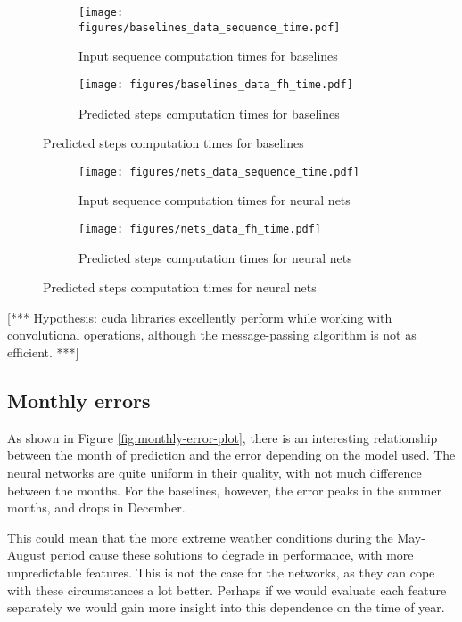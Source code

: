 \begin{figure}
\centering
  \begin{subfigure}[b]{0.49\textwidth}
    \texttt{[image: figures/baselines\_data\_sequence\_time.pdf]}
    \caption{Input sequence computation times for baselines}
    \label{fig:1}
  \end{subfigure}
 \hfill
  \begin{subfigure}[b]{0.49\textwidth}
    \texttt{[image: figures/baselines\_data\_fh\_time.pdf]}
    \caption{Predicted steps computation times for baselines}
    \label{fig:baselines-computation-times}
  \end{subfigure}
\end{figure}

\begin{figure}
\centering
  \begin{subfigure}[b]{0.49\textwidth}
    \texttt{[image: figures/nets\_data\_sequence\_time.pdf]}
    \caption{Input sequence computation times for neural nets}
    \label{fig:1}
  \end{subfigure}
 \hfill
  \begin{subfigure}[b]{0.49\textwidth}
    \texttt{[image: figures/nets\_data\_fh\_time.pdf]}
    \caption{Predicted steps computation times for neural nets}
    \label{fig:nets-computation-times}
  \end{subfigure}
\end{figure}
[*** Hypothesis: cuda libraries excellently perform while working with convolutional operations, although the message-passing algorithm is not as efficient. ***]

\FloatBarrier

\subsection{Monthly errors}
As shown in Figure \ref{fig:monthly-error-plot}, there is an interesting relationship between the month of prediction and the error depending on the model used. The neural networks are quite uniform in their quality, with not much difference between the months. For the baselines, however, the error peaks in the summer months, and drops in December.

This could mean that the more extreme weather conditions during the May-August period cause these solutions to degrade in performance, with more unpredictable features. This is not the case for the networks, as they can cope with these circumstances a lot better. Perhaps if we would evaluate each feature separately we would gain more insight into this dependence on the time of year.

